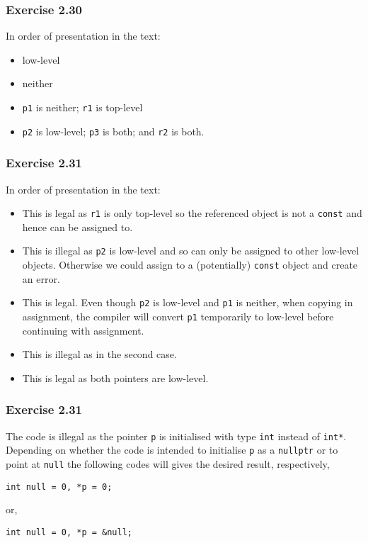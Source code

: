 \documentclass[12pt, a4paper]{article}
\begin{document}
\subsubsection*{Exercise 2.30}
In order of presentation in the text:
\begin{itemize}
	\item low-level
	\item neither
	\item \texttt{p1} is neither; \texttt{r1} is top-level
	\item \texttt{p2} is low-level; \texttt{p3} is both; and \texttt{r2} is both.
\end{itemize}

\subsubsection*{Exercise 2.31}
In order of presentation in the text:
\begin{itemize}
	\item 
		This is legal as \texttt{r1} is only top-level so the referenced object is not a \texttt{const} and hence can be assigned to.
	\item 
		This is illegal as \texttt{p2} is low-level and so can only be assigned to other low-level objects. Otherwise we could assign to a (potentially) \texttt{const} object and create an error.
	\item 
		This is legal. Even though \texttt{p2} is low-level and \texttt{p1} is neither, when copying in assignment, the compiler will convert \texttt{p1} temporarily to low-level before continuing with assignment.
	\item 
		This is illegal as in the second case.
	\item 
		This is legal as both pointers are low-level.
\end{itemize}

\subsubsection*{Exercise 2.31}
The code is illegal as the pointer \texttt{p} is initialised with type \texttt{int} instead of \texttt{int*}. Depending on whether the code is intended to initialise \texttt{p} as a \texttt{nullptr} or to point at \texttt{null} the following codes will gives the desired result, respectively,
\begin{center}
	\texttt{int null = 0, *p = 0;}
\end{center}
or,
\begin{center}
	\texttt{int null = 0, *p = \&null;}
\end{center}
\end{document}
